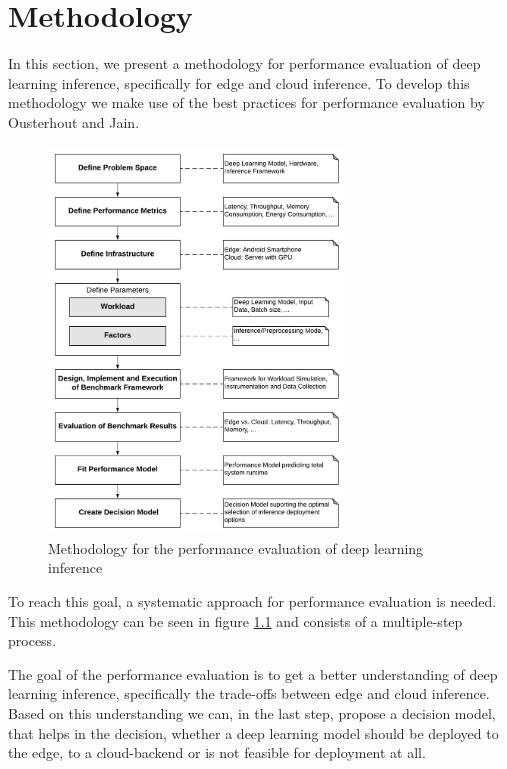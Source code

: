 \chapter{Methodology}
\label{chap:methodology}

In this section, we present a methodology for performance evaluation of deep learning inference, specifically for edge and cloud inference.
To develop this methodology we make use of the best practices for performance evaluation by Ousterhout \cite{Ousterhout:2018:AMO:3234519.3213770} and Jain\cite{books/daglib/0076234}.


\begin{figure}[!htb]
\centering
\includegraphics[width=0.7\textwidth]{./Bilder/Methodology.pdf}
\caption{Methodology for the performance evaluation of deep learning inference}
\label{fig:Methodology}
\end{figure}
To reach this goal, a systematic approach for performance evaluation is needed.
This methodology can be seen in figure \ref{fig:Methodology} and consists of a multiple-step process.


The goal of the performance evaluation is to get a better understanding of deep learning inference, specifically the trade-offs between edge and cloud inference.
Based on this understanding we can, in the last step, propose a decision model, that helps in the decision, whether a deep learning model should be deployed to the edge, to a cloud-backend or is not feasible for deployment at all.


